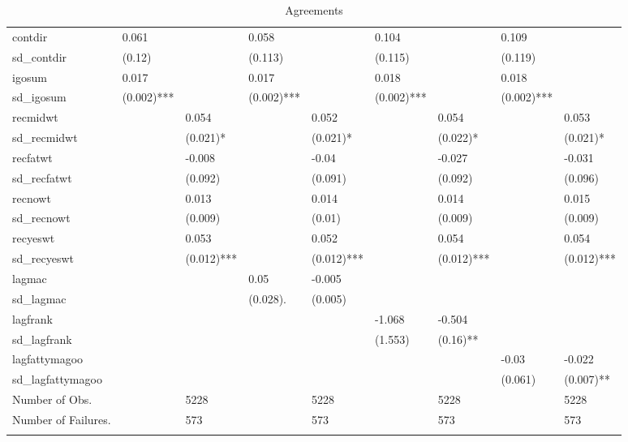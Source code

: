 \begin{table}[ht]
\begin{tabular}{lllllllll}
  contdir & 0.061 &  & 0.058 &  & 0.104 &  & 0.109 &  \\ 
  sd\_contdir & (0.12)  &  & (0.113)  &  & (0.115)  &  & (0.119)  &  \\ 
  igosum & 0.017 &  & 0.017 &  & 0.018 &  & 0.018 &  \\ 
  sd\_igosum & (0.002)*** &  & (0.002)*** &  & (0.002)*** &  & (0.002)*** &  \\ 
  recmidwt &  & 0.054 &  & 0.052 &  & 0.054 &  & 0.053 \\ 
  sd\_recmidwt &  & (0.021)* &  & (0.021)* &  & (0.022)* &  & (0.021)* \\ 
  recfatwt &  & -0.008 &  & -0.04 &  & -0.027 &  & -0.031 \\ 
  sd\_recfatwt &  & (0.092)  &  & (0.091)  &  & (0.092)  &  & (0.096)  \\ 
  recnowt &  & 0.013 &  & 0.014 &  & 0.014 &  & 0.015 \\ 
  sd\_recnowt &  & (0.009)  &  & (0.01)  &  & (0.009)  &  & (0.009)  \\ 
  recyeswt &  & 0.053 &  & 0.052 &  & 0.054 &  & 0.054 \\ 
  sd\_recyeswt &  & (0.012)*** &  & (0.012)*** &  & (0.012)*** &  & (0.012)*** \\ 
  lagmac &  &  & 0.05 & -0.005 &  &  &  &  \\ 
  sd\_lagmac &  &  & (0.028). & (0.005)  &  &  &  &  \\ 
  lagfrank &  &  &  &  & -1.068 & -0.504 &  &  \\ 
  sd\_lagfrank &  &  &  &  & (1.553)  & (0.16)** &  &  \\ 
  lagfattymagoo &  &  &  &  &  &  & -0.03 & -0.022 \\ 
  sd\_lagfattymagoo &  &  &  &  &  &  & (0.061)  & (0.007)** \\ 
  Number of Obs. &  & 5228 &  & 5228 &  & 5228 &  & 5228 \\ 
  Number of Failures. &  & 573 &  & 573 &  & 573 &  & 573 \\ 
   \hline \footnotesize{  }
\end{tabular}
\caption{Agreements} 
\end{table}

